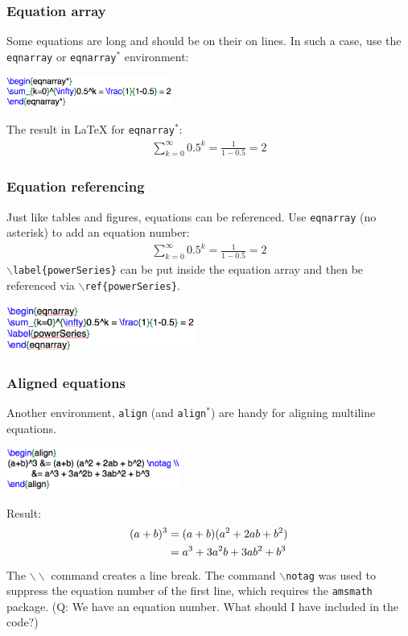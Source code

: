 \begin{frame} \frametitle{Equation array}
Some equations are long and should be on their on lines. In such a case, use the \texttt{\color{highlight}eqnarray} or \texttt{\color{highlight}eqnarray$^*$} environment:
\begin{center}
\includegraphics[height=0.4in]{math/eqnarrayStar}
\end{center}
The result in LaTeX for \texttt{\color{highlight}eqnarray$^*$}:
\begin{eqnarray*}
\sum_{k=0}^{\infty}0.5^k = \frac{1}{1-0.5} = 2
\end{eqnarray*}
\end{frame}

\begin{frame} \frametitle{Equation referencing}
Just like tables and figures, equations can be referenced. Use \texttt{\color{highlight}eqnarray} (no asterisk) to add an equation number:
\begin{eqnarray}
\sum_{k=0}^{\infty}0.5^k = \frac{1}{1-0.5} = 2
\end{eqnarray}
\texttt{\color{command}$\backslash$label}\texttt{\color{braces}\{}\texttt{powerSeries}\texttt{\color{braces}\}} can be put inside the equation array and then be referenced via \texttt{\color{command}$\backslash$ref}\texttt{\color{braces}\{}\texttt{powerSeries}\texttt{\color{braces}\}}.
\begin{center}
\includegraphics[height=0.6in]{math/eqnarray}
\end{center}
\end{frame}

\begin{frame} \frametitle{Aligned equations}
Another environment, \texttt{\color{highlight}align} (and \texttt{\color{highlight}align$^*$}) are handy for aligning multiline equations.
\begin{center}
\includegraphics[height=14mm]{math/align}
\end{center}
Result:
\begin{align}
(a+b)^3 &= (a+b) (a^2 + 2ab + b^2) \notag \\
	      &= a^3 + 3a^2b + 3ab^2 + b^3
\end{align}
The \texttt{\color{command}$\backslash\backslash$} command creates a line break. The command \texttt{\color{command}$\backslash$notag} was used to suppress the equation number of the first line, which requires the \texttt{\color{highlight}amsmath} package. (Q: We have an equation number. What should I have included in the code?)
\end{frame}

